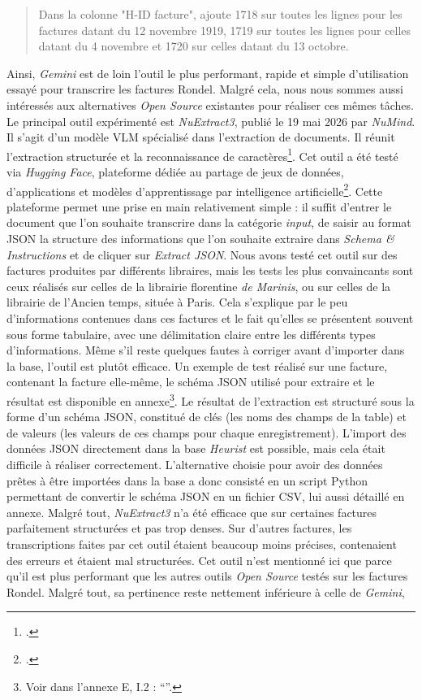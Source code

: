 \begin{quote}
    Dans la colonne "H-ID facture", ajoute 1718  sur toutes les lignes pour les factures datant du 12 novembre 1919, 1719 sur toutes les lignes pour celles datant du 4 novembre et 1720  sur celles datant du 13 octobre. 
\end{quote}

Ainsi, \emph{Gemini} est de loin l'outil le plus performant, rapide et simple d'utilisation essayé pour transcrire les factures Rondel. Malgré cela, nous nous sommes aussi intéressés aux alternatives \emph{Open Source} existantes pour réaliser ces mêmes tâches. Le principal outil expérimenté est \emph{NuExtract3}, publié le 19 mai 2026 par \emph{NuMind}. Il s'agit d'un modèle VLM spécialisé dans l'extraction de documents. Il réunit l'extraction structurée et la reconnaissance de caractères\footcite{numind_nuextract_nodate}. Cet outil a été testé via \emph{Hugging Face}, plateforme dédiée au partage de jeux de données, d'applications et modèles d'apprentissage par intelligence artificielle\footcite{noauthor_nuextract_nodate}. Cette plateforme permet une prise en main relativement simple : il suffit d'entrer le document que l'on souhaite transcrire dans la catégorie \emph{input}, de saisir au format JSON la structure des informations que l'on souhaite extraire dans \emph{Schema \& Instructions} et de cliquer sur \emph{Extract JSON}. Nous avons testé cet outil sur des factures produites par différents libraires, mais les tests les plus convaincants sont ceux réalisés sur celles de la librairie florentine \emph{de Marinis}, ou sur celles de la librairie de l'Ancien temps, située à Paris. Cela s'explique par le peu d'informations contenues dans ces factures et le fait qu'elles se présentent souvent sous forme tabulaire, avec une délimitation claire entre les différents types d'informations. Même s'il reste quelques fautes à corriger avant d'importer dans la base, l'outil est plutôt efficace. Un exemple de test réalisé sur une facture, contenant la facture elle-même, le schéma JSON utilisé pour extraire et le résultat est disponible en annexe\footnote{Voir dans l'annexe E, I.2 : \enquote{}.}. Le résultat de l'extraction est structuré sous la forme d'un schéma JSON, constitué de clés (les noms des champs de la table) et de valeurs (les valeurs de ces champs pour chaque enregistrement). L'import des données JSON directement dans la base \emph{Heurist} est possible, mais cela était difficile à réaliser correctement. L'alternative choisie pour avoir des données prêtes à être importées dans la base a donc consisté en un script Python permettant de convertir le schéma JSON en un fichier CSV, lui aussi détaillé en annexe. Malgré tout, \emph{NuExtract3} n'a été efficace que sur certaines factures parfaitement structurées et pas trop denses. Sur d'autres factures, les transcriptions faites par cet outil étaient beaucoup moins précises, contenaient des erreurs et étaient mal structurées. Cet outil n'est mentionné ici que parce qu'il est plus performant que les autres outils \emph{Open Source} testés sur les factures Rondel. Malgré tout, sa pertinence reste nettement inférieure à celle de \emph{Gemini}, 